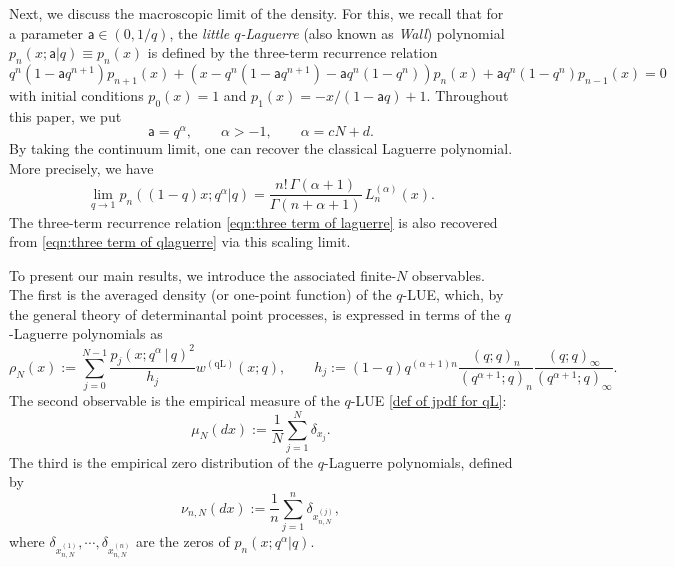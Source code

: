 \documentclass{amsart}
\theoremstyle{plain}
\theoremstyle{remark}
\numberwithin{equation}{section}
\begin{document}
\bigskip 



Next, we discuss the macroscopic limit of the density. For this, we recall that for a parameter $\mathsf{a}\in (0,1/q)$, the \emph{little $q$-Laguerre} (also known as \emph{Wall}) polynomial $p_{n}(x;\mathsf{a}|q)\equiv p_{n}(x)$ \cite[Section 14.20]{KLS10} is defined by the three-term recurrence relation 
\begin{equation}\label{eqn:three term of qlaguerre}
    q^{n}(1-\mathsf{a}q^{n+1})p_{n+1}(x)+(x-q^{n}(1-\mathsf{a}q^{n+1})-\mathsf{a}q^{n}(1-q^{n}))p_{n}(x)+\mathsf{a}q^{n}(1-q^{n})p_{n-1}(x)=0
\end{equation}
with initial conditions $p_0(x)=1$ and $p_1(x)=-x/(1-\mathsf{a} q)+1$. 
Throughout this paper, we put 
\begin{equation}
   \mathsf{a}=q^{\alpha},\qquad \alpha>-1, \qquad \alpha = cN + d. 
\end{equation} 
By taking the continuum limit, one can recover the classical Laguerre polynomial. More precisely, we have 
\begin{equation}\label{eqn: continuum limit to Laguerre polynomial}
    \lim_{q\rightarrow1}p_{n}((1-q)x;q^{\alpha}\vert q)=\frac{n! \,\Gamma(\alpha+1)}{ \Gamma(n+\alpha+1) }\,L_{n}^{(\alpha)}(x). 
\end{equation} 
The three-term recurrence relation \eqref{eqn:three term of laguerre} is also  recovered from \eqref{eqn:three term of qlaguerre} via this scaling limit. 

To present our main results, we introduce the associated finite-$N$ observables. 
The first is the averaged density (or one-point function) of the $q$-LUE, which, by the general theory of determinantal point processes, is expressed in terms of the $q$-Laguerre polynomials as
\begin{equation}
    \rho_{N}(x):= \sum_{j=0}^{N-1} \frac{ p_{j}(x;q^{\alpha}\,|\,q)^2 }{ h_j }  w^{(\mathrm{qL})}(x;q), \qquad h_j:=(1-q)q^{(\alpha+1)n}\frac{(q;q)_{n}}{(q^{\alpha+1};q)_{n}}\frac{(q;q)_{\infty}}{(q^{\alpha+1};q)_{\infty}}. 
\end{equation}  
The second observable is the empirical measure of the $q$-LUE  \eqref{def of jpdf for qL}: 
 \begin{equation}
  \mu_N(dx) := \frac{1}{N} \sum_{j=1}^N \delta_{x_j} .
 \end{equation}
The third is the empirical zero distribution of the $q$-Laguerre polynomials, defined by
\begin{equation} \label{def of ESD of zeros}
    \nu_{n,N}(dx):=\frac{1}{n}\sum_{j=1}^{n} \delta_{x_{n,N}^{(j)}},
\end{equation}
where $\delta_{x_{n,N}^{(1)}},\cdots,\delta_{x_{n,N}^{(n)}}$ are the zeros of $p_{n}(x;q^\alpha|q)$.  
\end{document}
